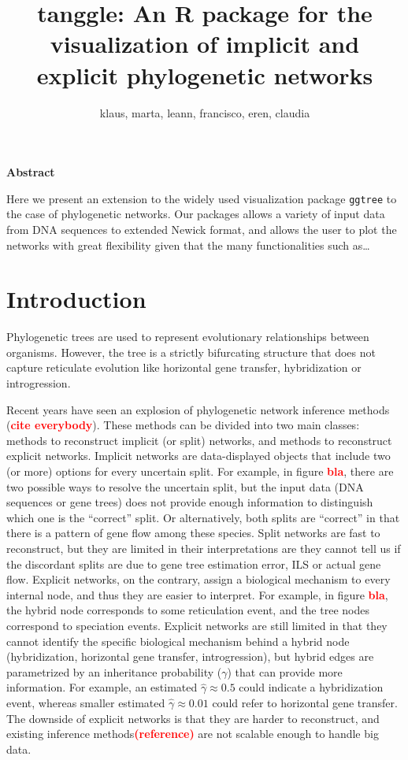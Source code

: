 \documentclass[]{article}
\title{tanggle: An R package for the visualization of implicit and explicit
phylogenetic networks}
\author{klaus, marta, leann, francisco, eren, claudia}
\date{}
\begin{document}
\maketitle

\begin{center}
\textbf{Abstract} 
\end{center}

Here we present an extension to the widely used visualization package
\texttt{ggtree} to the case of phylogenetic networks. Our packages
allows a variety of input data from DNA sequences to extended Newick
format, and allows the user to plot the networks with great flexibility
given that the many functionalities such as\ldots{}

\hypertarget{introduction}{%
\section{Introduction}\label{introduction}}

Phylogenetic trees are used to represent evolutionary relationships
between organisms. However, the tree is a strictly bifurcating structure
that does not capture reticulate evolution like horizontal gene
transfer, hybridization or introgression.

Recent years have seen an explosion of phylogenetic network inference
methods (\textcolor{red}{\textbf{cite everybody}}). These methods can be
divided into two main classes: methods to reconstruct implicit (or
split) networks, and methods to reconstruct explicit networks. Implicit
networks are data-displayed objects that include two (or more) options
for every uncertain split. For example, in figure
\textcolor{red}{\textbf{bla}}, there are two possible ways to resolve
the uncertain split, but the input data (DNA sequences or gene trees)
does not provide enough information to distinguish which one is the
``correct'' split. Or alternatively, both splits are ``correct'' in that
there is a pattern of gene flow among these species. Split networks are
fast to reconstruct, but they are limited in their interpretations are
they cannot tell us if the discordant splits are due to gene tree
estimation error, ILS or actual gene flow. Explicit networks, on the
contrary, assign a biological mechanism to every internal node, and thus
they are easier to interpret. For example, in figure
\textcolor{red}{\textbf{bla}}, the hybrid node corresponds to some
reticulation event, and the tree nodes correspond to speciation events.
Explicit networks are still limited in that they cannot identify the
specific biological mechanism behind a hybrid node (hybridization,
horizontal gene transfer, introgression), but hybrid edges are
parametrized by an inheritance probability (\(\gamma\)) that can provide
more information. For example, an estimated \(\hat{\gamma} \approx 0.5\)
could indicate a hybridization event, whereas smaller estimated
\(\hat{\gamma} \approx 0.01\) could refer to horizontal gene transfer.
The downside of explicit networks is that they are harder to
reconstruct, and existing inference
methods\textcolor{red}{\textbf{(reference)}} are not scalable enough to
handle big data.
\end{document}

